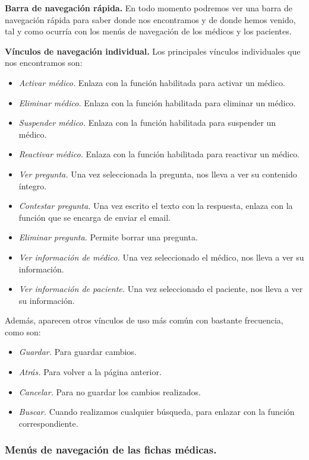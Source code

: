 		\textbf{Barra de navegación rápida.} En todo momento podremos ver una barra de navegación rápida para saber donde nos encontramos y de donde hemos venido, tal y como ocurría con los menús de navegación de los médicos y los pacientes.
		
		\textbf{Vínculos de navegación individual.} Los principales vínculos individuales que nos encontramos son:
		\begin{itemize}
			\item \textit{Activar médico.} Enlaza con la función habilitada para activar un médico.
			\item \textit{Eliminar médico.} Enlaza con la función habilitada para eliminar un médico.
			\item \textit{Suspender médico.} Enlaza con la función habilitada para suspender un médico.
			\item \textit{Reactivar médico.} Enlaza con la función habilitada para reactivar un médico. 
			\item \textit{Ver pregunta.} Una vez seleccionada la pregunta, nos lleva a ver su contenido íntegro.
			\item \textit{Contestar pregunta.} Una vez escrito el texto con la respuesta, enlaza con la función que se encarga de enviar el email.
			\item \textit{Eliminar pregunta.} Permite borrar una pregunta.
			\item \textit{Ver información de médico.} Una vez seleccionado el médico, nos lleva a ver su información.
			\item \textit{Ver información de paciente.} Una vez seleccionado el paciente, nos lleva a ver su información.
		\end{itemize}
		
		Además, aparecen otros vínculos de uso más común con bastante frecuencia, como son:
		\begin{itemize}
			\item \textit{Guardar.} Para guardar cambios.
			\item \textit{Atrás.} Para volver a la página anterior.
			\item \textit{Cancelar.} Para no guardar los cambios realizados.
			\item \textit{Buscar.} Cuando realizamos cualquier búsqueda, para enlazar con la función correspondiente.
		\end{itemize}
		
		
		\newpage
		\subsubsection{Menús de navegación de las fichas médicas.} %
		\label{par:nav_menus_de_navegacion_de_las_fichas_medicas}
		
